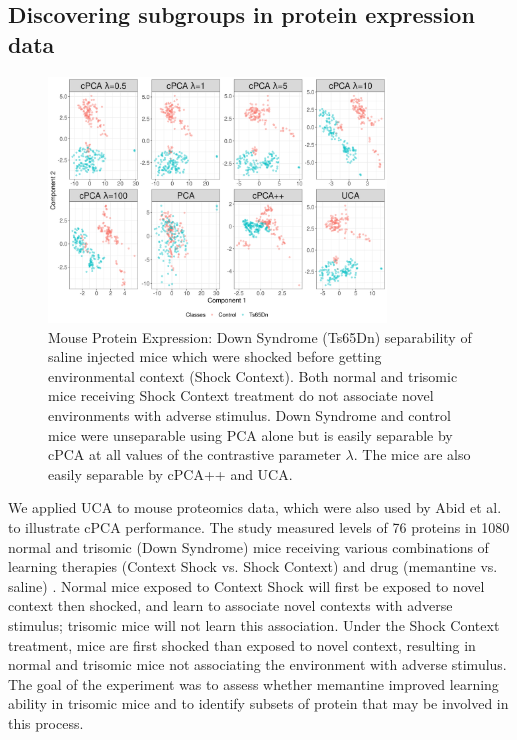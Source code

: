 \documentclass[12pt]{article}
\begin{document}
\subsection{\label{sec:mouse}Discovering subgroups in protein expression data}
\begin{figure}[th!]
  \centering
  \includegraphics[width = 0.8\textwidth]{figure/Mouse_Data.png}
  \caption{Mouse Protein Expression: Down Syndrome (Ts65Dn) separability of saline injected mice which were shocked before getting environmental context (Shock Context). Both normal and trisomic mice receiving Shock Context treatment do not associate novel environments with adverse stimulus. Down Syndrome and control mice were unseparable using PCA alone but is easily separable by cPCA at all values of the contrastive parameter $\lambda$. The mice are also easily separable by cPCA++ and UCA.}
  \label{fig:Mouse}
\end{figure}


We applied UCA to mouse proteomics data, which were also used by Abid et al. \cite{Abid} to illustrate cPCA performance. The study measured levels of 76 proteins in 1080 normal and trisomic (Down Syndrome) mice receiving various combinations of learning therapies (Context Shock vs. Shock Context) and drug (memantine vs. saline) \cite{Ahmed, Higuera, Abid}. Normal mice exposed to Context Shock will first be exposed to novel context then shocked, and learn to associate novel contexts with adverse stimulus; trisomic mice will not learn this association. Under the Shock Context treatment, mice are first shocked than exposed to novel context, resulting in normal and trisomic mice not associating the environment with adverse stimulus. The goal of the experiment was to assess whether memantine improved learning ability in trisomic mice and to identify subsets of protein that may be involved in this process.
\end{document}
